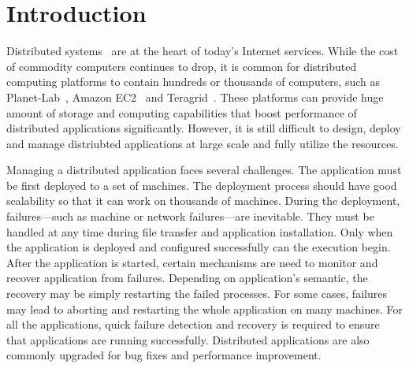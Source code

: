 \section{Introduction}


Distributed systems~\cite{Ghemawat2003, DeCandia2007} are at
the heart of today's Internet services. While the cost of
commodity computers continues to drop, it is common for
distributed computing platforms to contain hundreds or
thousands of computers, such as
Planet-Lab~\cite{Bavier2004}, Amazon
EC2~\cite{Garfinkel2007} and Teragrid~\cite{Catlett2002}.
These platforms can provide huge amount of storage and
computing capabilities that boost performance of distributed
applications significantly. However, it is still difficult
to design, deploy and manage distriubted applications at
large scale and fully utilize the resources.


Managing a distributed application faces several challenges.
The application must be first deployed to a set of machines.
The deployment process should have good scalability so that
it can work on thousands of machines. During the deployment,
failures---such as machine or network failures---are
inevitable. They must be handled at any time during file
transfer and application installation. Only when the
application is deployed and configured successfully can the
execution begin. After the application is started, certain
mechanisms are need to monitor and recover application from
failures.  Depending on application's semantic, the recovery
may be simply restarting the failed processes. For some
cases, failures may lead to aborting and restarting the
whole application on many machines. For all the
applications, quick failure detection and recovery is
required to ensure that applications are running
successfully. Distributed applications are also commonly
upgraded for bug fixes and performance improvement.

